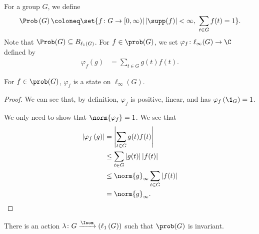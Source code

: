 \begin{definition}
  For a group $G$, we define
  \begin{align*}
    \Prob\left(G\right) \coloneq \set{f\colon G\rightarrow [0,\infty) | \left\vert \supp(f) \right\vert < \infty,~\sum_{t\in G}f(t) = 1}.
  \end{align*}
  Note that $\Prob(G) \subseteq B_{\ell_1\left(G\right)}$. For $f\in \prob(G)$, we set $\varphi_f\colon \ell_{\infty}(G)\rightarrow \C$ defined by
  \begin{align*}
    \varphi_f\left(g\right) &= \sum_{t\in G}g(t)f(t).
  \end{align*}\label{def:state_on_prob_g}
\end{definition}
\begin{fact}
  For $f\in \prob(G)$, $\varphi_f$ is a state on $\ell_{\infty}\left(G\right)$.\label{fact:prob_g_state}
\end{fact}
\begin{proof}
We can see that, by definition, $\varphi_f$ is positive, linear, and has $\varphi_f\left(\1_{G}\right) = 1$.\newline

We only need to show that $\norm{\varphi_f} = 1$. We see that
\begin{align*}
  \left\vert \varphi_f\left(g\right) \right\vert &= \left\vert \sum_{t\in G}g(t)f(t) \right\vert\\
                                                 &\leq \sum_{t\in G}\left\vert g(t) \right\vert\left\vert f(t) \right\vert\\
                                                 &\leq \norm{g}_{\infty}\sum_{t\in G}\left\vert f(t) \right\vert\\
                                                 &= \norm{g}_{\infty}.
\end{align*}
\end{proof}
\begin{proposition}
  There is an action $\lambda\colon G\xrightarrow \Isom\left(\ell_{1}\left(G\right)\right)$ such that $\prob(G)$ is invariant.
\end{proposition}
